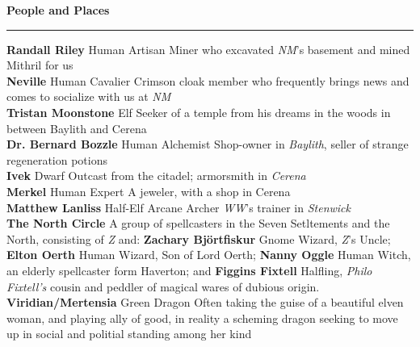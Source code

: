 \documentclass[letterpaper]{article}
\newcommand{\e}[1]{\emph{#1}}
\newcommand{\B}[1]{\textbf{#1}}
\newenvironment{notesection}[1]
{ {\huge \B{#1}}\hrule\vspace{0.5em}\begingroup\fontsize{9pt}{12pt}\selectfont}
{\endgroup}
\newcommand{\person}[3]{\B{#1
    \ifstrequal{#2}{M}{{\color{ProcessBlue}\male}}{%
    \ifstrequal{#2}{F}{\color{VioletRed}\female}{}}}{\scriptsize #3}}
\begin{document}
\begin{notesection}{People and Places}
\person{Randall Riley}{M}{Human Artisan} Miner who excavated \e{NM}'s basement and mined Mithril for us\\
\person{Neville}{M}{Human Cavalier} Crimson cloak member who frequently brings news and comes to socialize with us at \e{NM}\\
\person{Tristan Moonstone}{M}{Elf} Seeker of a temple from his dreams in the woods in between Baylith and Cerena\\
\person{Dr. Bernard Bozzle}{M}{Human Alchemist} Shop-owner in \e{Baylith}, seller of strange regeneration potions\\
\person{Ivek}{M}{Dwarf} Outcast from the citadel; armorsmith in \e{Cerena}\\
\person{Merkel}{F}{Human Expert} A jeweler, with a shop in Cerena\\
\person{Matthew Lanliss}{M}{Half-Elf Arcane Archer} \e{WW}'s trainer in \e{Stenwick}\\
\B{The North Circle} A group of spellcasters in the Seven Setltements and the North, consisting of \e{Z} and: \person{Zachary Bj\"{o}rtfiskur}{M}{Gnome Wizard}, \e{Z}'s Uncle; \person{Elton Oerth}{M}{Human Wizard}, Son of Lord Oerth; \person{Nanny Oggle}{F}{Human Witch}, an elderly spellcaster form Haverton; and \person{Figgins Fixtell}{M}{Halfling}, \e{Philo Fixtell's} cousin and peddler of magical wares of dubious origin. \\
\person{Viridian/Mertensia}{F}{Green Dragon} Often taking the guise of a beautiful elven woman, and playing ally of good, in reality a scheming dragon seeking to move up in social and politial standing among her kind \\


\end{notesection}
\end{document}
